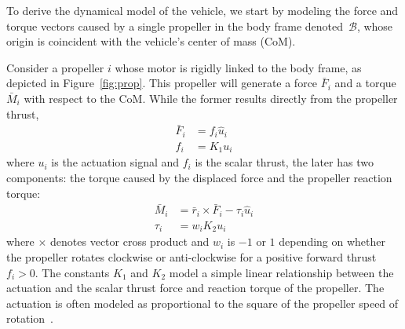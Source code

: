 
To derive the dynamical model of the vehicle, we start by modeling the
force and torque vectors caused by a single propeller in the body
frame denoted~$\mathcal{B}$, whose origin is coincident with the
vehicle's center of mass (CoM).

Consider a propeller $i$ whose motor is rigidly linked to the
body frame, as depicted in Figure~\ref{fig:prop}.  This propeller will
generate a force $\bar{F}_i$ and a torque $\bar{M}_i$ with respect to
the CoM. While the former results directly from the
propeller thrust,
\begin{align}
  \label{eq:Fi}
  \bar{F}_i &= f_i \hat{u}_i \\
  f_i &= K_1 u_i
\end{align}
where $u_i$ is the actuation signal and $f_i$ is the scalar thrust,
the later has two components: the torque caused by the displaced force
and the propeller reaction torque:
\begin{align}
  \label{eq:Mi}
  \bar{M}_i &= \bar{r}_i\times\bar{F}_i - \tau_i \hat{u}_i \\
  \tau_i &= w_i K_2 u_i
\end{align}
where $\times$ denotes vector cross product and $w_i$ is $-1$ or $1$ depending on whether the propeller rotates
clockwise or anti-clockwise for a positive forward thrust $f_i>0$.
The constants $K_1$ and $K_2$ model a simple linear relationship
between the actuation and the scalar thrust force and reaction torque
of the propeller. The actuation is often modeled as proportional to
the square of the propeller speed of rotation~\cite{mahony12}.

